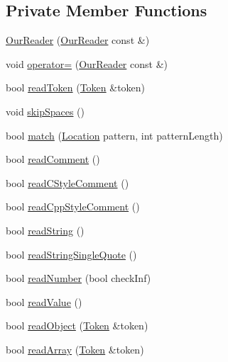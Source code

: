 \subsection*{Private Member Functions}
\begin{DoxyCompactItemize}
\item 
\hyperlink{class_json_1_1_our_reader_aee013005522c0d34d2e14962851487ac}{Our\+Reader} (\hyperlink{class_json_1_1_our_reader}{Our\+Reader} const \&)
\item 
void \hyperlink{class_json_1_1_our_reader_ad418de7c47bd3d0510888e22110b796e}{operator=} (\hyperlink{class_json_1_1_our_reader}{Our\+Reader} const \&)
\item 
bool \hyperlink{class_json_1_1_our_reader_a0d1e66da47fe2e85f5033c59326dfdc3}{read\+Token} (\hyperlink{class_json_1_1_our_reader_1_1_token}{Token} \&token)
\item 
void \hyperlink{class_json_1_1_our_reader_a6fbc6d58a4505e5ccadf330b57b17ca5}{skip\+Spaces} ()
\item 
bool \hyperlink{class_json_1_1_our_reader_a4a03f1b266def9b47c4fef35386557fb}{match} (\hyperlink{class_json_1_1_our_reader_a1bdc7bbc52ba87cae6b19746f2ee0189}{Location} pattern, int pattern\+Length)
\item 
bool \hyperlink{class_json_1_1_our_reader_a90f6bb9e55b2bc3d6c1880809495c222}{read\+Comment} ()
\item 
bool \hyperlink{class_json_1_1_our_reader_aba784b125baa1b62387e767b791f2f89}{read\+C\+Style\+Comment} ()
\item 
bool \hyperlink{class_json_1_1_our_reader_ae3de80671f0f997053e1c1c8a47a45c5}{read\+Cpp\+Style\+Comment} ()
\item 
bool \hyperlink{class_json_1_1_our_reader_a5d39b12671499ec5975f3bbc84b7d438}{read\+String} ()
\item 
bool \hyperlink{class_json_1_1_our_reader_ac78592defdc333faf56c6d0908758da3}{read\+String\+Single\+Quote} ()
\item 
bool \hyperlink{class_json_1_1_our_reader_aefcb9a78cc45870ccac2db2a66c8ec50}{read\+Number} (bool check\+Inf)
\item 
bool \hyperlink{class_json_1_1_our_reader_a1765d9670d191c89a57a22ea5591d35f}{read\+Value} ()
\item 
bool \hyperlink{class_json_1_1_our_reader_aea198f8101dba55099f4d8121a993530}{read\+Object} (\hyperlink{class_json_1_1_our_reader_1_1_token}{Token} \&token)
\item 
bool \hyperlink{class_json_1_1_our_reader_a0b9f58faf4212c6ecb5d8e2a1ac10257}{read\+Array} (\hyperlink{class_json_1_1_our_reader_1_1_token}{Token} \&token)

\end{DoxyCompactItemize}
